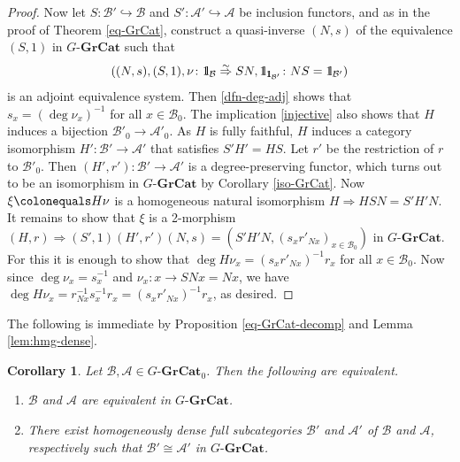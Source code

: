 \documentclass{surv-l}
\numberwithin{equation}{chapter}
\numberwithin{figure}{chapter}
\theoremstyle{plain}
\newtheorem{cor}[thm]{Corollary}
\theoremstyle{definition}
\theoremstyle{remark}
\newcommand{\id}{1\kern-.25em{\text{{\rm l}}}}
\newcommand{\GGrCat}{G\text{-}\mathbf{GrCat}}
\begin{document}
\begin{proof}
Now let
$S \colon \mathcal{B}' \hookrightarrow \mathcal{B}$ and $S' \colon \mathcal{A}' \hookrightarrow \mathcal{A}$ be inclusion functors,
and as in the proof of Theorem \ref{eq-GrCat},
construct a quasi-inverse $(N, s)$ of the equivalence $(S, 1)$ in $\GGrCat$
such that
\begin{equation*}
((N, s), (S, 1), \nu \colon \id_{\mathcal{B}} \overset{\sim}{\Rightarrow} SN, \id_{\id_{\mathcal{B}'}} \colon NS = \id_{\mathcal{B}'})
\end{equation*}
is an adjoint equivalence system.
Then \eqref{dfn-deg-adj} shows that $s_x=(\deg \nu_x)^{-1}$ for all $x \in \mathcal{B}_0$.
The implication \eqref{injective} also shows that
$H$ induces a bijection $\mathcal{B}'_0 \to \mathcal{A}'_0$.
As $H$ is fully faithful, $H$ induces a category isomorphism $H' \colon \mathcal{B}' \to \mathcal{A}'$
that satisfies $S'H' = HS$.
Let $r'$ be the restriction of $r$ to $\mathcal{B}'_0$.
Then $(H', r') \colon \mathcal{B}' \to \mathcal{A}'$ is a degree-preserving functor,
which turns out to be an isomorphism in $\GGrCat$ by Corollary \ref{iso-GrCat}.
Now $\xi\colonequals H\nu$ is a homogeneous natural isomorphism $H \Rightarrow HSN = S'H'N$.
It remains to show that $\xi$ is a 2-morphism
$(H, r) \Rightarrow (S', 1)(H', r')(N, s) = (S'H'N, (s_xr'_{Nx})_{x\in \mathcal{B}_0})$
in $\GGrCat$.
For this it is enough to show that $\deg H\nu_x = (s_xr'_{Nx})^{-1} r_x$
for all $x \in \mathcal{B}_0$.
Now since $\deg \nu_x = s_x^{-1}$ and $\nu_x \colon x \to SNx = Nx$,
we have $\deg H\nu_x = r_{Nx}^{-1} s_x^{-1} r_x = (s_xr'_{Nx})^{-1} r_x$,
as desired.
\end{proof}

The following is immediate by Proposition \ref{eq-GrCat-decomp}
and Lemma \ref{lem:hmg-dense}.

\begin{cor}
Let $\mathcal{B}, \mathcal{A} \in \GGrCat_0$.  Then the following are equivalent.
\begin{enumerate}
\item
$\mathcal{B}$ and $\mathcal{A}$ are equivalent in $\GGrCat$.
\item
There exist homogeneously dense full subcategories $\mathcal{B}'$ and $\mathcal{A}'$
of $\mathcal{B}$ and $\mathcal{A}$, respectively such that $\mathcal{B}' \cong \mathcal{A}'$ in $\GGrCat$.
\end{enumerate}
\end{cor}
\end{document}
